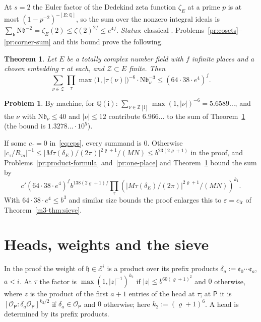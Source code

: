 \documentclass[reqno]{amsart}
\theoremstyle{definition}
\newtheorem{problem}{Problem}[section]
\theoremstyle{plain}
\newtheorem{theorem}{Theorem}[section]
\theoremstyle{remark}
\newcommand{\Z}{\mathbb{Z}}
\newcommand{\Q}{\mathbb{Q}}
\newcommand{\ii}{\mathrm{i}}
\newcommand{\hh}{\mathfrak{h}}
\newcommand{\Ec}{\mathcal{E}}
\newcommand{\Zc}{\mathcal{Z}}
\newcommand{\Pf}{\mathsf{P}}
\newcommand{\OP}{\mathcal{O}_{\mathsf P}}
\newcommand{\ee}{\mathfrak{e}}
\newcommand{\Nm}{\mathrm{N}}
\begin{document}
At \(s=2\) the Euler factor of the Dedekind zeta function \(\zeta_E\) at a prime \(p\) is at most \((1-p^{-2})^{-[E:\Q]}\), so the sum over the nonzero integral ideals is \(\sum_{\mathfrak b}\Nm\mathfrak b^{-2}=\zeta_E(2)\le\zeta(2)^{2f}\le e^{4f}\).  \emph{Status}: classical \cite{Ne}.  Problems~\ref{pr:cosets}--\ref{pr:corner-sum} and this bound prove the following.

\begin{theorem}\label{thm:frequencies}
Let \(E\) be a totally complex number field with \(f\) infinite places and a chosen embedding \(\tau\) at each, and \(\Zc\subset E\) finite.  Then
\[
 \sum_{\nu\in\Zc}\prod_\tau\max\bigl(1,\lvert\tau(\nu)\rvert\bigr)^{-6}\cdot\Nm\mathfrak b_\nu^{-3}\le(64\cdot38\cdot e^4)^f .
\]
\end{theorem}

\begin{problem}\label{pr:frequencies-qi}
By machine, for \(\Q(\ii)\): \(\sum_{\nu\in\Z[\ii]}\max(1,\lvert\nu\rvert)^{-6}=5.6589\ldots\), and the \(\nu\) with \(\Nm\mathfrak b_\nu\le40\) and \(\lvert\nu\rvert\le12\) contribute \(6.966\ldots\) to the sum of Theorem~\ref{thm:frequencies} (the bound is \(1.3278\ldots\cdot10^5\)).
\end{problem}

If some \(c_\tau=0\) in~\eqref{eq:eps}, every summand is \(0\).  Otherwise \(\lvert c_\tau/R_{\tau a}\rvert^{-1}\le\lvert M\tau(\delta_E)/(2\pi)\rvert^{2\varrho+1}/(MN)\le b^{23(2\varrho+1)}\) in the proof, and Problems~\ref{pr:product-formula} and~\ref{pr:one-place} and Theorem~\ref{thm:frequencies} bound the sum by
\[
 c'(64\cdot38\cdot e^4)^fb^{138(2\varrho+1)f}\prod_\tau(\lvert M\tau(\delta_E)/(2\pi)\rvert^{2\varrho+1}/(MN))^{k_1}.
\]
With \(64\cdot38\cdot e^4\le b^3\) and similar size bounds the proof enlarges this to \(\varepsilon=c_{\mathrm{fr}}\) of Theorem~\ref{m3-thm:sieve}.

\section{Heads, weights and the sieve}\label{sec:heads}

In the proof the weight of \(\hh\in\Ec^i\) is a product over its prefix products \(\delta_a:=\ee_0\cdots\ee_a\), \(a<i\).  At \(\tau\) the factor is \(\max(1,\lvert z\rvert^{-1})^{k_2}\) if \(\lvert z\rvert\le b^{60(\varrho+1)^2}\) and \(0\) otherwise, where \(z\) is the product of the first \(a+1\) entries of the head at \(\tau\); at \(\Pf\) it is \([\OP:\delta_a\OP]^{k_2/2}\) if \(\delta_a\in\OP\) and \(0\) otherwise; here \(k_2:=(\varrho+1)^6\).  A head is determined by its prefix products.
\end{document}
